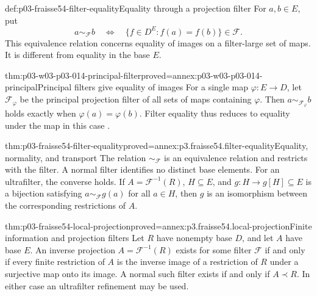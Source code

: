 \begin{hbdefinition}{def:p03-fraisse54-filter-equality}{Equality through a projection filter}
For \(a,b\in E\), put
\[
 a\sim_{\mathcal F}b
 \quad\Longleftrightarrow\quad
 \{f\in D^E:f(a)=f(b)\}\in\mathcal F.
\]
This equivalence relation concerns equality of images on a filter-large set
of maps. It is different from equality in the base \(E\).
\end{hbdefinition}

\begin{hblemma}{thm:p03-w03-p03-014-principal-filter}{proved=annex:p03-w03-p03-014-principal}{Principal filters give equality of images}
For a single map \(\varphi:E\to D\), let \(\mathcal F_\varphi\) be the
principal projection filter of all sets of maps containing \(\varphi\).
Then \(a\sim_{\mathcal F_\varphi}b\) holds exactly when
\(\varphi(a)=\varphi(b)\). Filter equality thus reduces to equality
under the map in this case \cite[\S3.9, p.~372]{Fraisse1954}.
\end{hblemma}

\begin{hblemma}{thm:p03-fraisse54-filter-equality}{proved=annex:p3.fraisse54.filter-equality}{Equality, normality, and transport}
The relation \(\sim_{\mathcal F}\) is an equivalence relation and restricts
with the filter. A normal filter identifies no distinct base elements.
For an ultrafilter, the converse holds. If
\(A=\mathcal F^{-1}(R)\), \(H\subseteq E\), and
\(g:H\to g[H]\subseteq E\) is a bijection satisfying
\(a\sim_{\mathcal F}g(a)\) for all \(a\in H\), then \(g\) is an
isomorphism between the corresponding restrictions of \(A\).
\end{hblemma}

\begin{hbtheorem}{thm:p03-fraisse54-local-projection}{proved=annex:p3.fraisse54.local-projection}{Finite information and projection filters}
Let \(R\) have nonempty base \(D\), and let \(A\) have base \(E\).
An inverse projection \(A=\mathcal F^{-1}(R)\) exists for some filter
\(\mathcal F\) if and only if every finite restriction of \(A\) is the
inverse image of a restriction of \(R\) under a surjective map onto its
image. A normal such filter exists if and only if \(A\prec R\).
In either case an ultrafilter refinement may be used.
\end{hbtheorem}

